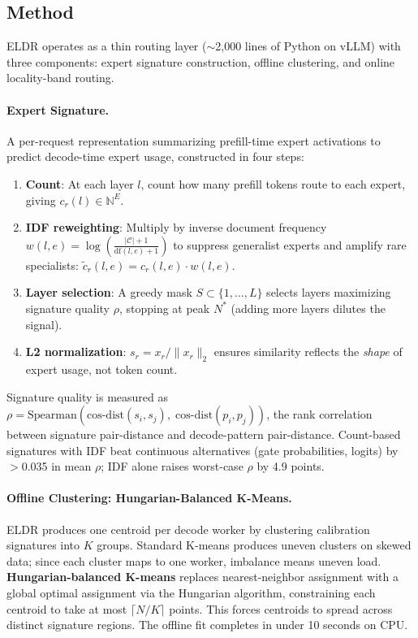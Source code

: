 \documentclass[11pt,a4paper]{article}
\begin{document}
\subsection{Method}

ELDR operates as a thin routing layer ($\sim$2,000 lines of Python on vLLM) with three components: expert signature construction, offline clustering, and online locality-band routing.

\paragraph{Expert Signature.} A per-request representation summarizing prefill-time expert activations to predict decode-time expert usage, constructed in four steps:

\begin{enumerate}
\item \textbf{Count}: At each layer $l$, count how many prefill tokens route to each expert, giving $c_r(l) \in \mathbb{N}^E$.
\item \textbf{IDF reweighting}: Multiply by inverse document frequency $w(l,e) = \log\!\left(\frac{|\mathcal{C}|+1}{\mathrm{df}(l,e)+1}\right)$ to suppress generalist experts and amplify rare specialists: $\tilde{c}_r(l,e) = c_r(l,e) \cdot w(l,e)$.
\item \textbf{Layer selection}: A greedy mask $S \subset \{1,\ldots,L\}$ selects layers maximizing signature quality $\rho$, stopping at peak $N^*$ (adding more layers dilutes the signal).
\item \textbf{L2 normalization}: $s_r = x_r / \|x_r\|_2$ ensures similarity reflects the \emph{shape} of expert usage, not token count.
\end{enumerate}

Signature quality is measured as $\rho = \mathrm{Spearman}(\mathrm{cos\text{-}dist}(s_i, s_j),\; \mathrm{cos\text{-}dist}(p_i, p_j))$, the rank correlation between signature pair-distance and decode-pattern pair-distance. Count-based signatures with IDF beat continuous alternatives (gate probabilities, logits) by $>$0.035 in mean $\rho$; IDF alone raises worst-case $\rho$ by 4.9 points.

\paragraph{Offline Clustering: Hungarian-Balanced K-Means.} ELDR produces one centroid per decode worker by clustering calibration signatures into $K$ groups. Standard K-means produces uneven clusters on skewed data; since each cluster maps to one worker, imbalance means uneven load. \textbf{Hungarian-balanced K-means} replaces nearest-neighbor assignment with a global optimal assignment via the Hungarian algorithm, constraining each centroid to take at most $\lceil N/K \rceil$ points. This forces centroids to spread across distinct signature regions. The offline fit completes in under 10 seconds on CPU.
\end{document}

